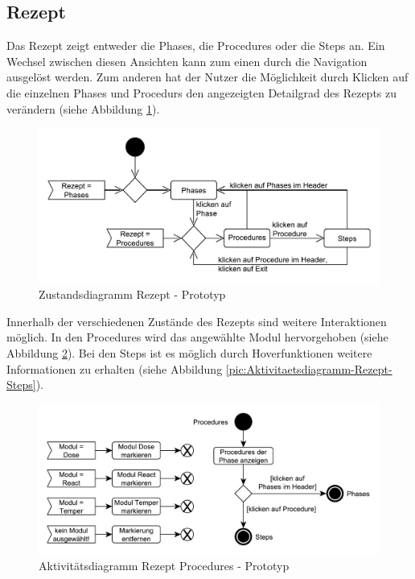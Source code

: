 \subsection{Rezept}
Das Rezept zeigt entweder die Phases, die Procedures oder die Steps an. Ein Wechsel zwischen diesen Ansichten kann zum einen durch die Navigation ausgelöst werden. Zum anderen hat der Nutzer die Möglichkeit durch Klicken auf die einzelnen Phases und Procedurs den angezeigten Detailgrad des Rezepts zu verändern (siehe Abbildung \ref{pic:Zustandsdiagramm-Rezept}).
\begin{figure}[htbp]
\centering
\includegraphics[scale=0.6]{DA_files/UML/Prototyp/Zustandsdiagramm-Rezept.pdf}
\caption{Zustandsdiagramm Rezept - Prototyp}
\label{pic:Zustandsdiagramm-Rezept}
\end{figure}
Innerhalb der verschiedenen Zustände des Rezepts sind weitere Interaktionen möglich. In den Procedures wird das angewählte Modul hervorgehoben (siehe Abbildung \ref{pic:Aktivitaetsdiagramm-Rezept-Procedures}). Bei den Steps ist es möglich durch Hoverfunktionen weitere Informationen zu erhalten (siehe Abbildung \ref{pic:Aktivitaetsdiagramm-Rezept-Steps}).
\begin{figure}[htbp]
\centering
\includegraphics[scale=0.6]{DA_files/UML/Prototyp/Aktivitaetsdiagramm-Rezept-Procedures.pdf}
\caption{Aktivitätsdiagramm Rezept Procedures - Prototyp}
\label{pic:Aktivitaetsdiagramm-Rezept-Procedures}
\end{figure}

